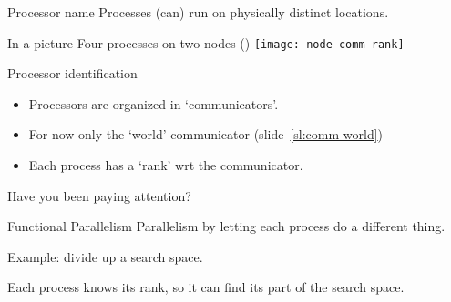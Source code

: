 \begin{numberedframe}{Processor name}
  Processes (can) run on physically distinct locations.

\end{numberedframe}


\begin{exerciseframe}
  
\end{exerciseframe}

\begin{numberedframe}{In a picture}
  Four processes on two nodes ()
  \texttt{[image: node-comm-rank]}
\end{numberedframe}

\begin{numberedframe}{Processor identification}
  \begin{itemize}
  \item Processors are organized in `communicators'.
  \item For now only the `world' communicator
    (slide~\ref{sl:comm-world})
  \item Each process has a `rank' wrt the communicator.
  \end{itemize}
\end{numberedframe}


\begin{numberedframe}{Have you been paying attention?}
  
\end{numberedframe}

\begin{exerciseframe}[commrank]
  
\end{exerciseframe}

\begin{exerciseframe}[commrank]
  
\end{exerciseframe}


\begin{numberedframe}{Functional Parallelism}
  Parallelism by letting each process do a different thing.

  Example: divide up a search space.

  Each process knows its rank, so it can find its part of the search space.
\end{numberedframe}

\begin{exerciseframe}[prime]
  
\end{exerciseframe}

\begin{exerciseframe}
  
\end{exerciseframe}

\endinput

\begin{numberedframe}\frametitle{}
\begin{lstlisting}
  
\end{lstlisting}
\end{numberedframe}

